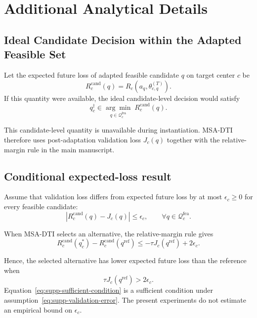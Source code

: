 \documentclass[11pt,a4paper]{article}
\begin{document}
\section{Additional Analytical Details}
\label{supp:analysis}

\subsection{Ideal Candidate Decision within the Adapted Feasible Set}

Let the expected future loss of adapted feasible candidate $q$ on target
center $c$ be
\begin{equation}
R_c^{\mathrm{cand}}(q)
=
R_c\left(a_q,\theta_{c,q}^{(T)}\right).
\label{eq:supp-candidate-risk}
\end{equation}
If this quantity were available, the ideal candidate-level decision would
satisfy
\begin{equation}
q_c^{\dagger}
\in
\underset{q\in\mathcal{Q}_{c}^{\mathrm{fea}}}
{\arg\min}\;
R_c^{\mathrm{cand}}(q).
\label{eq:supp-ideal-target}
\end{equation}

This candidate-level quantity is unavailable during instantiation. MSA-DTI
therefore uses post-adaptation validation loss $J_c(q)$ together with the
relative-margin rule in the main manuscript.

\subsection{Conditional expected-loss result}

Assume that validation loss differs from expected future loss by at most
$\epsilon_c\geq0$ for every feasible candidate:
\begin{equation}
\left|
R_c^{\mathrm{cand}}(q)-J_c(q)
\right|
\leq
\epsilon_c,
\qquad
\forall q\in\mathcal{Q}_{c}^{\mathrm{fea}}.
\label{eq:supp-validation-error}
\end{equation}

When MSA-DTI selects an alternative, the relative-margin rule gives
\begin{equation}
R_c^{\mathrm{cand}}(q_c^{*})
-
R_c^{\mathrm{cand}}(q^{\mathrm{ref}})
\leq
-\tau J_c(q^{\mathrm{ref}})
+
2\epsilon_c.
\label{eq:supp-expected-loss}
\end{equation}

Hence, the selected alternative has lower expected future loss than the
reference when
\begin{equation}
\tau J_c(q^{\mathrm{ref}})>2\epsilon_c.
\label{eq:supp-sufficient-condition}
\end{equation}
Equation~\eqref{eq:supp-sufficient-condition} is a sufficient condition under
assumption~\eqref{eq:supp-validation-error}. The present experiments do not
estimate an empirical bound on $\epsilon_c$.
\end{document}
